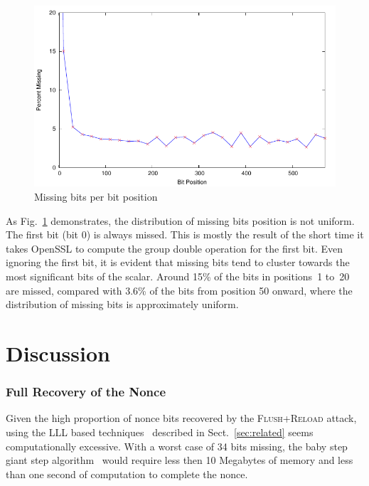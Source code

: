\documentclass[twocolumn]{svjour3}
\newcommand{\fl}{\textsc{Flu\-sh+\allowbreak Re\-load}\xspace}
\begin{document}
\begin{figure}[htb]
\includegraphics[width=\columnwidth]{images/positions}
\caption{Missing bits per bit position\label{dgm:missed}}
\end{figure}

As Fig.~\ref{dgm:missed} demonstrates, the distribution of missing bits position is not uniform.
The first bit (bit 0) is always missed.
This is mostly the result of the short time it takes OpenSSL to compute the group double operation for the first bit.
Even ignoring the first bit, it is evident that missing bits tend to cluster towards the most significant bits of the
scalar.
Around 15\% of the bits in positions~1 to~20 are missed, compared with 3.6\% of the bits from position 50 onward,
where the distribution of missing bits is approximately uniform.





\section{Discussion}\label{sec:discussion}

\subsubsection*{Full Recovery of the Nonce}\label{sub:full_nonce}
Given the high proportion of nonce bits recovered by the \fl attack, using the LLL based techniques~\cite{Howgrave-GrahamS01,nguyen03insecurity} described in Sect.~\ref{sec:related} seems computationally excessive. 
With a worst case of 34 bits missing, the baby step giant step algorithm~\cite{shanks71class} would require less then 10 Megabytes of memory and less than one second of computation to complete the nonce.
\end{document}
